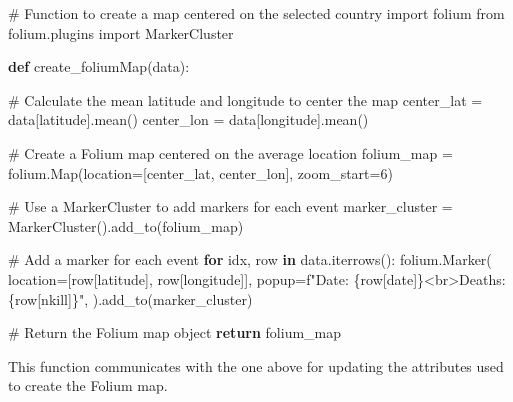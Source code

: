 \documentclass[
  letterpaper,
  DIV=11,
  numbers=noendperiod]{scrreprt}
\newenvironment{Shaded}{\begin{snugshade}}{\end{snugshade}}
\newcommand{\CommentTok}[1]{\textcolor[rgb]{0.37,0.37,0.37}{#1}}
\newcommand{\ControlFlowTok}[1]{\textcolor[rgb]{0.00,0.23,0.31}{\textbf{#1}}}
\newcommand{\DecValTok}[1]{\textcolor[rgb]{0.68,0.00,0.00}{#1}}
\newcommand{\ImportTok}[1]{\textcolor[rgb]{0.00,0.46,0.62}{#1}}
\newcommand{\KeywordTok}[1]{\textcolor[rgb]{0.00,0.23,0.31}{\textbf{#1}}}
\newcommand{\NormalTok}[1]{\textcolor[rgb]{0.00,0.23,0.31}{#1}}
\newcommand{\OperatorTok}[1]{\textcolor[rgb]{0.37,0.37,0.37}{#1}}
\newcommand{\SpecialCharTok}[1]{\textcolor[rgb]{0.37,0.37,0.37}{#1}}
\newcommand{\SpecialStringTok}[1]{\textcolor[rgb]{0.13,0.47,0.30}{#1}}
\newcommand{\StringTok}[1]{\textcolor[rgb]{0.13,0.47,0.30}{#1}}
\begin{document}
\begin{Shaded}
\begin{Highlighting}[]
\CommentTok{\# Function to create a map centered on the selected country}
\ImportTok{import}\NormalTok{ folium}
\ImportTok{from}\NormalTok{ folium.plugins }\ImportTok{import}\NormalTok{ MarkerCluster}

\KeywordTok{def}\NormalTok{ create\_foliumMap(data):}

    \CommentTok{\# Calculate the mean latitude and longitude to center the map}
\NormalTok{    center\_lat }\OperatorTok{=}\NormalTok{ data[}\StringTok{\textquotesingle{}latitude\textquotesingle{}}\NormalTok{].mean()}
\NormalTok{    center\_lon }\OperatorTok{=}\NormalTok{ data[}\StringTok{\textquotesingle{}longitude\textquotesingle{}}\NormalTok{].mean()}

    \CommentTok{\# Create a Folium map centered on the average location}
\NormalTok{    folium\_map }\OperatorTok{=}\NormalTok{ folium.Map(location}\OperatorTok{=}\NormalTok{[center\_lat, center\_lon], zoom\_start}\OperatorTok{=}\DecValTok{6}\NormalTok{)}

    \CommentTok{\# Use a MarkerCluster to add markers for each event}
\NormalTok{    marker\_cluster }\OperatorTok{=}\NormalTok{ MarkerCluster().add\_to(folium\_map)}

    \CommentTok{\# Add a marker for each event}
    \ControlFlowTok{for}\NormalTok{ idx, row }\KeywordTok{in}\NormalTok{ data.iterrows():}
\NormalTok{        folium.Marker(}
\NormalTok{            location}\OperatorTok{=}\NormalTok{[row[}\StringTok{\textquotesingle{}latitude\textquotesingle{}}\NormalTok{], row[}\StringTok{\textquotesingle{}longitude\textquotesingle{}}\NormalTok{]],}
\NormalTok{            popup}\OperatorTok{=}\SpecialStringTok{f"Date: }\SpecialCharTok{\{}\NormalTok{row[}\StringTok{\textquotesingle{}date\textquotesingle{}}\NormalTok{]}\SpecialCharTok{\}}\SpecialStringTok{\textless{}br\textgreater{}Deaths: }\SpecialCharTok{\{}\NormalTok{row[}\StringTok{\textquotesingle{}nkill\textquotesingle{}}\NormalTok{]}\SpecialCharTok{\}}\SpecialStringTok{"}\NormalTok{,}
\NormalTok{        ).add\_to(marker\_cluster)}

    \CommentTok{\# Return the Folium map object}
    \ControlFlowTok{return}\NormalTok{ folium\_map}
\end{Highlighting}
\end{Shaded}

This function communicates with the one above for updating the
attributes used to create the Folium map.
\end{document}

